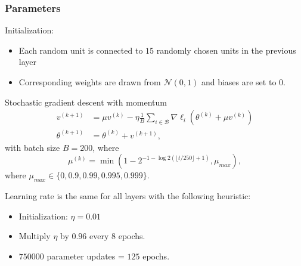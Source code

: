 \begin{frame}
	\frametitle{Parameters}
	
	Initialization: 
	\begin{itemize}
		\item Each random unit is connected to $15$ randomly chosen units in the previous layer
		\item Corresponding weights are drawn from $\mathcal{N}(0,1)$ and biases are set to $0$. 
	\end{itemize}
	
	
	
	\begin{block}{Stochastic gradient descent with momentum}
		\begin{align*}
			v^{(k+1)} & = \mu  v^{(k)} - \eta \frac{1}{B} \sum_{i \in \mathcal{B}} \nabla \ell_i (\theta^{(k)} + \mu  v^{(k)})\\
			\theta^{(k+1)} & = \theta^{(k)} + v^{(k+1)},
		\end{align*}	
		with batch size $B= 200$, where
		$$
		\mu^{(k)} = \min (1 - 2^{-1 - \log2(\lfloor t/250 \rfloor +1)}, \mu_{max}),
		$$
		where $\mu_{max} \in \{0, 0.9, 0.99, 0.995, 0.999\}$.
	\end{block}
	
	
	
	Learning rate is the same for all layers with the following heuristic: 
	\begin{itemize}
		\item Initialization: $\eta = 0.01$
		\item Multiply $\eta$ by $0.96$ every $8$ epochs.
		\item $750000$ parameter updates = $125$ epochs.
	\end{itemize}
	





\end{frame}




